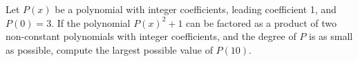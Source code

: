 Let $P(x)$ be a polynomial with integer coefficients, leading coefficient 1, and $P(0) = 3$. If the polynomial $P(x)^2 + 1$ can be factored as a product of two non-constant polynomials with integer coefficients, and the degree of $P$ is as small as possible, compute the largest possible value of $P(10)$.